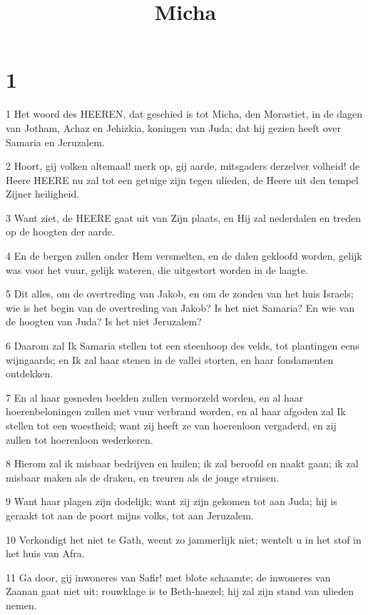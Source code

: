 

\title{Micha}



\chapter{1}

\par 1 Het woord des HEEREN, dat geschied is tot Micha, den Morastiet, in de dagen van Jotham, Achaz en Jehizkia, koningen van Juda; dat hij gezien heeft over Samaria en Jeruzalem.
\par 2 Hoort, gij volken altemaal! merk op, gij aarde, mitsgaders derzelver volheid! de Heere HEERE nu zal tot een getuige zijn tegen ulieden, de Heere uit den tempel Zijner heiligheid.
\par 3 Want ziet, de HEERE gaat uit van Zijn plaats, en Hij zal nederdalen en treden op de hoogten der aarde.
\par 4 En de bergen zullen onder Hem versmelten, en de dalen gekloofd worden, gelijk was voor het vuur, gelijk wateren, die uitgestort worden in de laagte.
\par 5 Dit alles, om de overtreding van Jakob, en om de zonden van het huis Israels; wie is het begin van de overtreding van Jakob? Is het niet Samaria? En wie van de hoogten van Juda? Is het niet Jeruzalem?
\par 6 Daarom zal Ik Samaria stellen tot een steenhoop des velds, tot plantingen eens wijngaards; en Ik zal haar stenen in de vallei storten, en haar fondamenten ontdekken.
\par 7 En al haar gesneden beelden zullen vermorzeld worden, en al haar hoerenbeloningen zullen met vuur verbrand worden, en al haar afgoden zal Ik stellen tot een woestheid; want zij heeft ze van hoerenloon vergaderd, en zij zullen tot hoerenloon wederkeren.
\par 8 Hierom zal ik misbaar bedrijven en huilen; ik zal beroofd en naakt gaan; ik zal misbaar maken als de draken, en treuren als de jonge struisen.
\par 9 Want haar plagen zijn dodelijk; want zij zijn gekomen tot aan Juda; hij is geraakt tot aan de poort mijns volks, tot aan Jeruzalem.
\par 10 Verkondigt het niet te Gath, weent zo jammerlijk niet; wentelt u in het stof in het huis van Afra.
\par 11 Ga door, gij inwoneres van Safir! met blote schaamte; de inwoneres van Zaanan gaat niet uit; rouwklage is te Beth-haezel; hij zal zijn stand van ulieden nemen.
